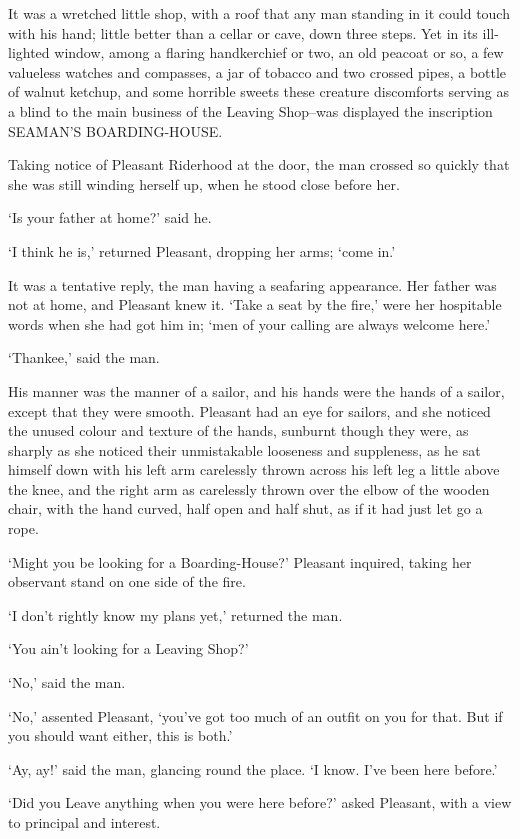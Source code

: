 It was a wretched little shop, with a roof that any man standing in it
could touch with his hand; little better than a cellar or cave, down
three steps. Yet in its ill-lighted window, among a flaring handkerchief
or two, an old peacoat or so, a few valueless watches and compasses, a
jar of tobacco and two crossed pipes, a bottle of walnut ketchup, and
some horrible sweets these creature discomforts serving as a blind to
the main business of the Leaving Shop--was displayed the inscription
SEAMAN’S BOARDING-HOUSE.

Taking notice of Pleasant Riderhood at the door, the man crossed so
quickly that she was still winding herself up, when he stood close
before her.

‘Is your father at home?’ said he.

‘I think he is,’ returned Pleasant, dropping her arms; ‘come in.’

It was a tentative reply, the man having a seafaring appearance. Her
father was not at home, and Pleasant knew it. ‘Take a seat by the fire,’
were her hospitable words when she had got him in; ‘men of your calling
are always welcome here.’

‘Thankee,’ said the man.

His manner was the manner of a sailor, and his hands were the hands of
a sailor, except that they were smooth. Pleasant had an eye for sailors,
and she noticed the unused colour and texture of the hands, sunburnt
though they were, as sharply as she noticed their unmistakable looseness
and suppleness, as he sat himself down with his left arm carelessly
thrown across his left leg a little above the knee, and the right arm
as carelessly thrown over the elbow of the wooden chair, with the hand
curved, half open and half shut, as if it had just let go a rope.

‘Might you be looking for a Boarding-House?’ Pleasant inquired, taking
her observant stand on one side of the fire.

‘I don’t rightly know my plans yet,’ returned the man.

‘You ain’t looking for a Leaving Shop?’

‘No,’ said the man.

‘No,’ assented Pleasant, ‘you’ve got too much of an outfit on you for
that. But if you should want either, this is both.’

‘Ay, ay!’ said the man, glancing round the place. ‘I know. I’ve been
here before.’

‘Did you Leave anything when you were here before?’ asked Pleasant, with
a view to principal and interest.

